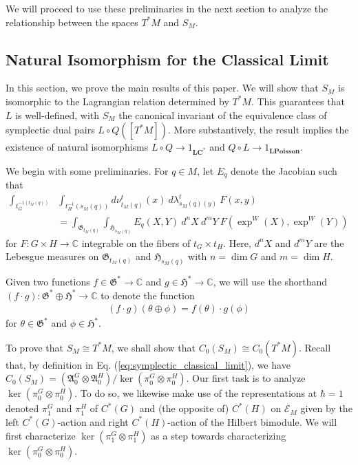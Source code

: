 \documentclass[sn-mathphys,Numbered]{sn-jnl}
\begin{document}
\noindent We will proceed to use these preliminaries in the next section to analyze the relationship between the spaces $T^*M$ and $S_M$.

\subsection{Natural Isomorphism for the Classical Limit}

In this section, we prove the main results of this paper.  We will show that $S_M$ is isomorphic to the Lagrangian relation determined by $T^*M$.  This guarantees that $L$ is well-defined, with $S_M$ the canonical invariant of the equivalence class of symplectic dual pairs $L\circ Q\left([T^*M]\right)$. More substantively, the result implies the existence of natural isomorphisms $L\circ Q\to 1_{\mathbf{LC^*}}$ and $Q\circ L\to 1_{\mathbf{LPoisson}}$.

We begin with some preliminaries.  For $q\in M$, let $E_q$ denote the Jacobian such that
\begin{align}
    \int_{t_G^{-1(t_M(q))}}&\int_{t_H^{-1}(s_M(q))} d\nu^t_{t_M(q)}(x)\ d\lambda^t_{s_M(q)(y)}\ F(x,y)\\
    &= \int_{\mathfrak{G}_{t_M(q)}}\int_{\mathfrak{H}_{s_M(q)}} E_q(X,Y)\ d^nX\ d^mY\ F(\exp^W(X),\exp^W(Y))
\end{align}
for $F: G\times H\to \mathbb{C}$ integrable on the fibers of $t_G\times t_H$.  Here, $d^nX$ and $d^mY$ are the Lebesgue measures on $\mathfrak{G}_{t_M(q)}$ and $\mathfrak{H}_{s_M(q)}$ with $n = \dim G$ and $m = \dim H$.

Given two functions $f\in \mathfrak{G}^*\to\mathbb{C}$ and $g\in \mathfrak{H}^*\to\mathbb{C}$, we will use the shorthand $(f\cdot g):\mathfrak{G}^*\oplus \mathfrak{H}^*\to\mathbb{C}$ to denote the function
\begin{align}
    (f\cdot g)(\theta\oplus \phi) = f(\theta)\cdot g(\phi)
\end{align}
for $\theta\in\mathfrak{G}^*$ and $\phi\in\mathfrak{H}^*$.

To prove that $S_M\cong T^*M$, we shall show that $C_0(S_M)\cong C_0(T^*M)$.  Recall that, by definition in Eq. (\ref{eq:symplectic_classical_limit}), we have $C_0(S_M) = (\mathfrak{A}^G_0\otimes\mathfrak{A}^H_0)/\ker(\pi^G_0\otimes\pi_0^H)$.  Our first task is to analyze $\ker(\pi_0^G\otimes \pi_0^H)$.  To do so, we likewise make use of the representations at $\hbar=1$ denoted $\pi_1^G$ and $\pi^H_1$ of $C^*(G)$ and (the opposite of) $C^*(H)$ on $\mathcal{E}_M$ given by the left $C^*(G)$-action and right $C^*(H)$-action of the Hilbert bimodule.  We will first characterize $\ker(\pi_1^G\otimes \pi_1^H)$ as a step towards characterizing $\ker(\pi_0^G\otimes \pi_0^H)$.
\end{document}
